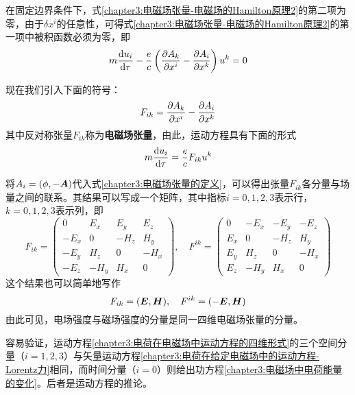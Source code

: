 在固定边界条件下，式\eqref{chapter3:电磁场张量-电磁场的Hamilton原理2}的第二项为零，由于$\delta x^i$的任意性，可得式\eqref{chapter3:电磁场张量-电磁场的Hamilton原理2}的第一项中被积函数必须为零，即
\begin{equation*}
	m\frac{\mathrm{d} u_i}{\mathrm{d} \tau} - \frac{e}{c}\left(\frac{\partial A_k}{\partial x^i} - \frac{\partial A_i}{\partial x^k}\right) u^k = 0
\end{equation*}

现在我们引入下面的符号：
\begin{equation}
	F_{ik} = \frac{\partial A_k}{\partial x^i} - \frac{\partial A_i}{\partial x^k}
	\label{chapter3:电磁场张量的定义}
\end{equation}
其中反对称张量$F_{ik}$称为{\bf 电磁场张量}，由此，运动方程具有下面的形式
\begin{equation}
	m\frac{\mathrm{d} u_i}{\mathrm{d} \tau} = \frac{e}{c}F_{ik}u^k
	\label{chapter3:电荷在电磁场中运动方程的四维形式}
\end{equation}

将$A_i=(\phi,-\boldsymbol{A})$代入式\eqref{chapter3:电磁场张量的定义}，可以得出张量$F_{ik}$各分量与场量之间的联系。其结果可以写成一个矩阵，其中指标$i=0,1,2,3$表示行，$k=0,1,2,3$表示列，即
\begin{equation}
	F_{ik} = \begin{pmatrix} 0 & E_x & E_y & E_z \\
							-E_x & 0 & -H_z & H_y \\
							-E_y & H_z & 0 & -H_x \\
							-E_z & -H_y & H_x & 0 \end{pmatrix},\quad
	F^{ik} = \begin{pmatrix} 0 & -E_x & -E_y & -E_z \\
							E_x & 0 & -H_z & H_y \\
							E_y & H_z & 0 & -H_x \\
							E_z & -H_y & H_x & 0 \end{pmatrix}
	\label{chapter3:电磁场张量的分量形式}
\end{equation}
这个结果也可以简单地写作
\begin{equation}
	F_{ik} = (\boldsymbol{E},\boldsymbol{H}),\quad F^{ik} = (-\boldsymbol{E},\boldsymbol{H})
\end{equation}
由此可见，电场强度与磁场强度的分量是同一四维电磁场张量的分量。

容易验证，运动方程\eqref{chapter3:电荷在电磁场中运动方程的四维形式}的三个空间分量（$i=1,2,3$）与矢量运动方程\eqref{chapter3:电荷在给定电磁场中的运动方程-Lorentz力}相同，而时间分量（$i=0$）则给出功方程\eqref{chapter3:电磁场中电荷能量的变化}。后者是运动方程的推论。

